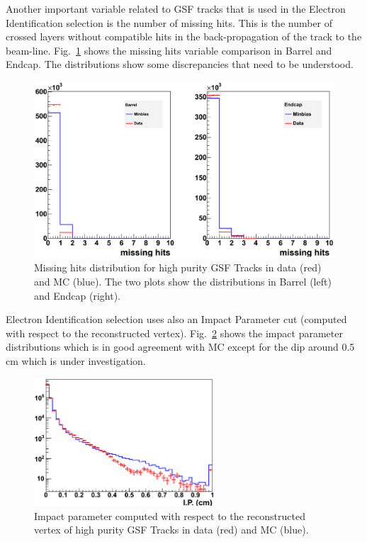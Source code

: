Another important variable related to GSF tracks that is used in the Electron Identification selection
is the number of missing hits. This is the number of crossed layers without compatible hits
in the back-propagation of the track to the beam-line.
Fig.~\ref{fig:mssinghits} shows the missing hits variable comparison in Barrel and Endcap. The distributions
show some discrepancies that need to be understood.

\begin{figure}
  \begin{center}
    \includegraphics[width=.8\textwidth]{Images/gsf_mishits.eps}
    \caption {Missing hits distribution for high purity GSF Tracks in data (red) and MC (blue). The two plots show the distributions in Barrel (left) and Endcap (right).}
    \label{fig:mssinghits}
  \end{center}
\end{figure}

Electron Identification selection uses also an Impact Parameter cut (computed with respect to the 
reconstructed vertex).
Fig.~\ref{fig:ip} shows the impact parameter distributions which is in good agreement with MC except
for the dip around 0.5 cm which is under investigation.

\begin{figure}
  \begin{center}
    \includegraphics[width=0.6\textwidth]{Images/gsf_ip.eps}
    \caption {Impact parameter computed with respect to the reconstructed vertex of high purity GSF Tracks in data (red) and MC (blue).}
    \label{fig:ip}
  \end{center}
\end{figure}

